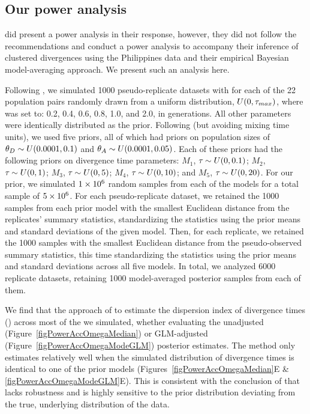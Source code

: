 \documentclass[letterpaper,12pt]{article}
\begin{document}
\begin{linenumbers}
\section*{Our power analysis}
\citet{Hickerson2013} did present a power analysis in their response, however,
they did not follow the recommendations and conduct a power analysis to
accompany their inference of clustered divergences using the Philippines data
and their empirical Bayesian model-averaging approach.
We present such an analysis here.

Following \citet{Oaks2012}, we simulated 1000 pseudo-replicate datasets with
\divt{} for each of the 22 population pairs randomly drawn from a uniform
distribution, $U(0, \tau_{max})$, where  was set to: 0.2, 0.4, 0.6,
0.8, 1.0, and 2.0, in \globalcoalunit generations.
All other parameters were identically distributed as the prior.
Following \citet{Hickerson2013} (but avoiding mixing time units), we used five
priors, all of which had priors on population sizes of $\meanDescendantTheta{}
\sim U(0.0001, 0.1)$ and $\ancestralTheta{} \sim U(0.0001, 0.05)$.
Each of these priors had the following priors on divergence time parameters:
$M_1$, $\tau_{} \sim U(0, 0.1)$;
$M_2$, $\tau_{} \sim U(0, 1)$;
$M_3$, $\tau_{} \sim U(0, 5)$;
$M_4$, $\tau_{} \sim U(0, 10)$; and
$M_5$, $\tau_{} \sim U(0, 20)$.
For our prior, we simulated $1\times 10^{6}$ random samples from each of the models
for a total sample of $5\times 10^{6}$.
For each pseudo-replicate dataset, we retained the 1000 samples from each prior
model with the smallest Euclidean distance from the replicates' summary
statistics, standardizing the statistics using the prior means and standard
deviations of the given model.
Then, for each replicate, we retained the 1000 samples with the smallest
Euclidean distance from the pseudo-observed summary statistics, this time
standardizing the statistics using the prior means and standard deviations
across all five models.
In total, we analyzed 6000 replicate datasets, retaining 1000 model-averaged
posterior samples from each of them.

We find that the approach of \citet{Hickerson2013} to estimate the dispersion
index of divergence times (\vmratio{}) across most of the  we
simulated, whether evaluating the unadjusted
(Figure~\ref{figPowerAccOmegaMedian}) or GLM-adjusted
(Figure~\ref{figPowerAccOmegaModeGLM}) posterior estimates.
The method only estimates \vmratio{} relatively well when the simulated
distribution of divergence times is identical to one of the prior models
(Figures~\ref{figPowerAccOmegaMedian}E \& \ref{figPowerAccOmegaModeGLM}E).
This is consistent with the conclusion of \citet{Oaks2012} that \msb lacks
robustness and is highly sensitive to the prior distribution deviating from the
true, underlying distribution of the data.


\end{linenumbers}
\end{document}

